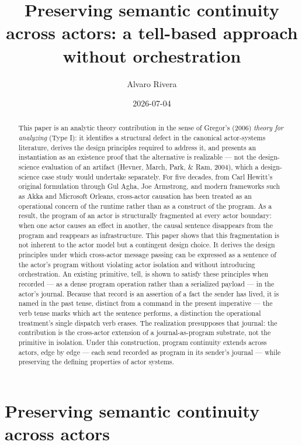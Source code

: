 \documentclass[
]{article}
\title{Preserving semantic continuity across actors: a tell-based
approach without orchestration}
\author{Alvaro Rivera}
\date{2026-07-04}
\begin{document}
\maketitle
\begin{abstract}
This paper is an analytic theory contribution in the sense of Gregor's
(2006) \emph{theory for analyzing} (Type I): it identifies a structural
defect in the canonical actor-systems literature, derives the design
principles required to address it, and presents an instantiation as an
existence proof that the alternative is realizable --- not the
design-science evaluation of an artifact (Hevner, March, Park, \& Ram,
2004), which a design-science case study would undertake separately. For
five decades, from Carl Hewitt's original formulation through Gul Agha,
Joe Armstrong, and modern frameworks such as Akka and Microsoft Orleans,
cross-actor causation has been treated as an operational concern of the
runtime rather than as a construct of the program. As a result, the
program of an actor is structurally fragmented at every actor boundary:
when one actor causes an effect in another, the causal sentence
disappears from the program and reappears as infrastructure. This paper
shows that this fragmentation is not inherent to the actor model but a
contingent design choice. It derives the design principles under which
cross-actor message passing can be expressed as a sentence of the
actor's program without violating actor isolation and without
introducing orchestration. An existing primitive, tell, is shown to
satisfy these principles when recorded --- as a dense program operation
rather than a serialized payload --- in the actor's journal. Because
that record is an assertion of a fact the sender has lived, it is named
in the past tense, distinct from a command in the present imperative ---
the verb tense marks which act the sentence performs, a distinction the
operational treatment's single dispatch verb erases. The realization
presupposes that journal: the contribution is the cross-actor extension
of a journal-as-program substrate, not the primitive in isolation. Under
this construction, program continuity extends across actors, edge by
edge --- each send recorded as program in its sender's journal --- while
preserving the defining properties of actor systems.
\end{abstract}

\section{Preserving semantic continuity across
actors}\label{preserving-semantic-continuity-across-actors}
\end{document}
